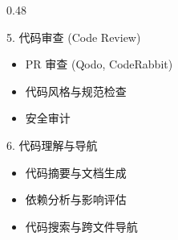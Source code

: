 \documentclass[aspectratio=169,10pt]{beamer}
\begin{document}
\begin{frame}
\begin{columns}[T]
\begin{column}{0.48\textwidth}
      \begin{block}{5. 代码审查 (Code Review)}
        \begin{itemize}
          \item PR 审查 (Qodo, CodeRabbit)
          \item 代码风格与规范检查
          \item 安全审计
        \end{itemize}
      \end{block}

      \begin{block}{6. 代码理解与导航}
        \begin{itemize}
          \item 代码摘要与文档生成
          \item 依赖分析与影响评估
          \item 代码搜索与跨文件导航
        \end{itemize}
      \end{block}
    \end{column}
  \end{columns}
\end{frame}
\end{document}
